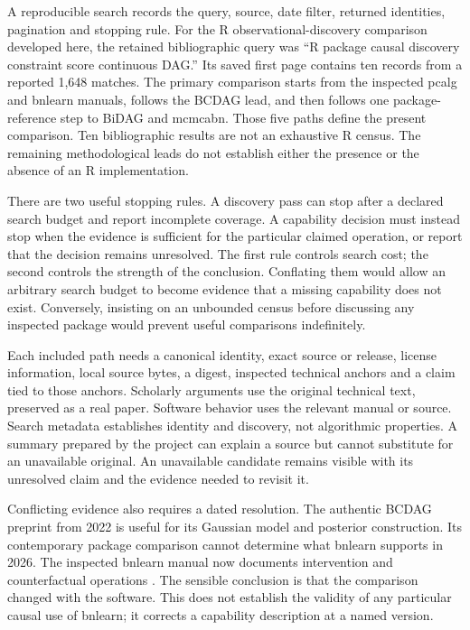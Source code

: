 A reproducible search records the query, source, date filter, returned
identities, pagination and stopping rule. For the R observational-discovery
comparison developed here, the retained bibliographic query was ``R package
causal discovery constraint score continuous DAG.'' Its saved first page
contains ten records from a reported 1,648 matches. The primary comparison
starts from the inspected pcalg and bnlearn manuals, follows the BCDAG lead,
and then follows one package-reference step to BiDAG and mcmcabn. Those five
paths define the present comparison. Ten bibliographic results are not an
exhaustive R census. The remaining methodological leads do not establish
either the presence or the absence of an R implementation.

There are two useful stopping rules. A discovery pass can stop after a
declared search budget and report incomplete coverage. A capability decision
must instead stop when the evidence is sufficient for the particular claimed
operation, or report that the decision remains unresolved. The first rule
controls search cost; the second controls the strength of the conclusion.
Conflating them would allow an arbitrary search budget to become evidence
that a missing capability does not exist. Conversely, insisting on an
unbounded census before discussing any inspected package would prevent useful
comparisons indefinitely.

Each included path needs a canonical identity, exact source or release,
license information, local source bytes, a digest, inspected technical anchors
and a claim tied to those anchors. Scholarly arguments use the original
technical text, preserved as a real paper. Software behavior uses the relevant
manual or source. Search metadata establishes identity and discovery, not
algorithmic properties. A summary prepared by the project can explain a
source but cannot substitute for an unavailable original. An unavailable
candidate remains visible with its unresolved claim and the evidence needed
to revisit it.

Conflicting evidence also requires a dated resolution. The authentic BCDAG
preprint from 2022 is useful for its Gaussian model and posterior construction.
Its contemporary package comparison cannot determine what bnlearn supports
in 2026. The inspected bnlearn manual now documents intervention and
counterfactual operations \citep{exec13_bcdag_paper,exec13_bnlearn}.
The sensible conclusion is that the comparison changed with the software.
This does not establish the validity of any particular causal use of bnlearn;
it corrects a capability description at a named version.

